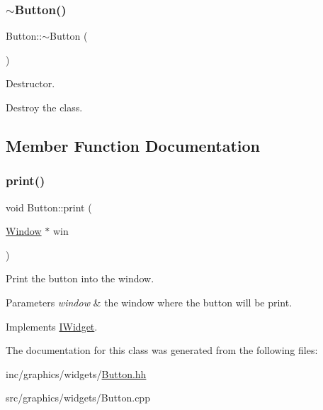 \subsubsection{\texorpdfstring{$\sim$\+Button()}{~Button()}}
{\footnotesize\ttfamily Button\+::$\sim$\+Button (\begin{DoxyParamCaption}{ }\end{DoxyParamCaption})}



Destructor. 

Destroy the class. 

\subsection{Member Function Documentation}
\mbox{\label{classButton_aaee0c62414711ae91084b05b38d0c8c5}} 
\subsubsection{\texorpdfstring{print()}{print()}}
{\footnotesize\ttfamily void Button\+::print (\begin{DoxyParamCaption}\item[{\hyperlink{classWindow}{Window} $\ast$}]{win }\end{DoxyParamCaption})\hspace{0.3cm}{\ttfamily [virtual]}}



Print the button into the window. 


\begin{DoxyParams}{Parameters}
{\em \textquotesingle{}window\textquotesingle{}} & the window where the button will be print. \\
\hline
\end{DoxyParams}


Implements \hyperlink{classIWidget_a0cfa49a402e9bb31808a715e048ab2f4}{I\+Widget}.



The documentation for this class was generated from the following files\+:\begin{DoxyCompactItemize}
\item 
inc/graphics/widgets/\hyperlink{Button_8hh}{Button.\+hh}\item 
src/graphics/widgets/Button.\+cpp\end{DoxyCompactItemize}
